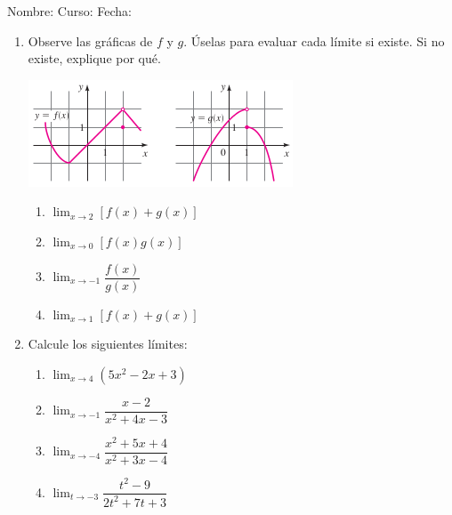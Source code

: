 \documentclass[letterpaper,fleqn]{article}
\newcommand{\LineaNombre}{%
\par
\vspace{\baselineskip}
Nombre:\hrulefill \; Curso: \underline{\hspace*{48pt}} \; Fecha: \underline{\hspace*{2.5cm}} \relax
\par}
\let\ds\displaystyle
\begin{document}
\LineaNombre
\begin{enumerate}
 \item Observe las gráficas de $f$ y $g$. Úselas para evaluar cada límite si existe. Si no existe, explique por qué.
\begin{center}
\includegraphics[scale=.8]{Images/funciones_fyg.png} 
\end{center}
\begin{enumerate}
\item $\ds{\lim_{x\rightarrow 2}}[f(x)+g(x)]$\noanswer
\item $\ds{\lim_{x\rightarrow 0}}[f(x)g(x)]$\noanswer
\item $\ds{\lim_{x\rightarrow -1}}\dfrac{f(x)}{g(x)}$\noanswer
\item $\ds{\lim_{x\rightarrow 1}}[f(x)+g(x)]$\noanswer
\end{enumerate}
\item Calcule los siguientes límites:
\begin{enumerate}
\item $\displaystyle{\lim_{x\rightarrow 4}}(5x^{2}-2x+3)$\noanswer
\newpage
\item $\displaystyle{\lim_{x\rightarrow -1}}\dfrac{x-2}{x^{2}+4x-3}$\noanswer
\item $\displaystyle{\lim_{x\rightarrow -4}}\dfrac{x^{2}+5x+4}{x^{2}+3x-4}$\noanswer
\item $\displaystyle{\lim_{t\rightarrow -3}}\dfrac{t^{2}-9}{2t^{2}+7t+3}$\noanswer
\end{enumerate}
 \end{enumerate}
\end{document}
